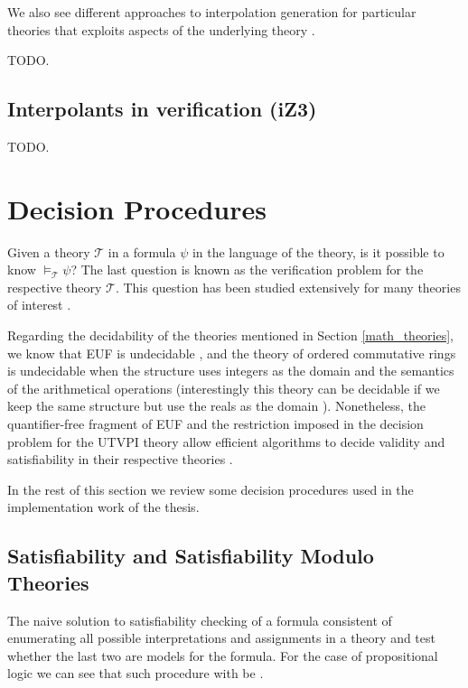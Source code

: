We also see different approaches to interpolation generation for particular
theories that exploits aspects of the underlying theory
\cite{10.1007/978-3-540-69738-1_25, 10.1007/11814771_21}.

TODO.

\subsection{Interpolants in verification (iZ3)}


TODO.

\section{Decision Procedures}

Given a theory $\mathcal{T}$ in a formula $\psi$ in 
the language of the theory, is it possible to know 
$\models_{\mathcal{T}} \psi$? The last question is 
known as the verification problem for the respective
theory $\mathcal{T}$. This question has been 
studied extensively for many theories of interest 
\cite{borger2001classical}. 

Regarding the decidability of the theories mentioned in Section \ref{math_theories}, we know that EUF is 
undecidable \cite{borger2001classical}, and the theory
of ordered commutative rings is undecidable when the
structure uses integers as the domain and the semantics
of the arithmetical operations \cite{DBLP:books/daglib/0076838} (interestingly this theory can be decidable if we
keep the same structure but use the reals as the domain
\cite{DBLP:books/daglib/0076838}).
Nonetheless, the quantifier-free fragment of EUF and 
the restriction imposed in the decision problem for 
the UTVPI theory allow efficient algorithms to decide 
validity and satisfiability in their respective theories 
\cite{10.1145/322186.322198, 10.1145/322217.322228, 10.1007/11559306_9}.

In the rest of this section we review some decision procedures used in
the implementation work of the thesis.

\subsection{Satisfiability and Satisfiability Modulo Theories}
 
The naive solution to satisfiability checking of a formula
consistent of enumerating all possible interpretations 
and assignments in a theory and test whether the last two are 
models for the formula. For the case of propositional logic 
we can see that such procedure with be .

